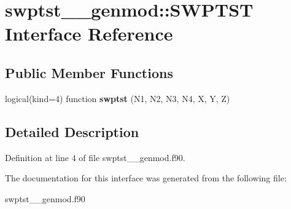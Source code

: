 \hypertarget{interfaceswptst____genmod_1_1_s_w_p_t_s_t}{\section{swptst\+\_\+\+\_\+genmod\+:\+:S\+W\+P\+T\+S\+T Interface Reference}
\label{interfaceswptst____genmod_1_1_s_w_p_t_s_t}
}
\subsection*{Public Member Functions}
\begin{DoxyCompactItemize}
\item 
\hypertarget{interfaceswptst____genmod_1_1_s_w_p_t_s_t_a763d157a68b140b4604cd257f2f2a6be}{logical(kind=4) function {\bfseries swptst} (N1, N2, N3, N4, X, Y, Z)}\label{interfaceswptst____genmod_1_1_s_w_p_t_s_t_a763d157a68b140b4604cd257f2f2a6be}

\end{DoxyCompactItemize}


\subsection{Detailed Description}


Definition at line 4 of file swptst\+\_\+\+\_\+genmod.\+f90.



The documentation for this interface was generated from the following file\+:\begin{DoxyCompactItemize}
\item 
swptst\+\_\+\+\_\+genmod.\+f90\end{DoxyCompactItemize}
